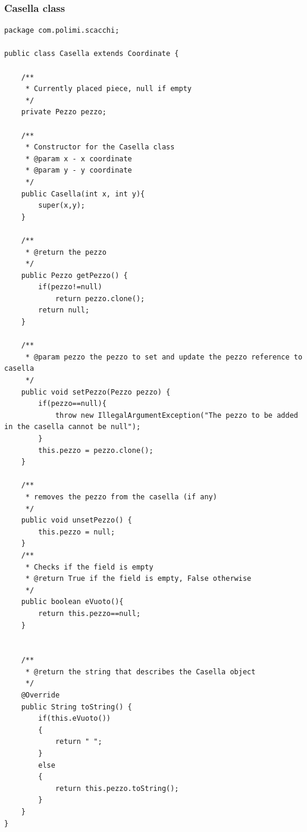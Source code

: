 \documentclass{article}
\begin{document}
\newpage

\subsubsection{Casella class}
\begin{lstlisting}
package com.polimi.scacchi;

public class Casella extends Coordinate {	
	
	/**
	 * Currently placed piece, null if empty
	 */
	private Pezzo pezzo;
	
	/**
	 * Constructor for the Casella class
	 * @param x - x coordinate
	 * @param y - y coordinate
	 */
	public Casella(int x, int y){
		super(x,y);
	}
	
	/**
	 * @return the pezzo
	 */
	public Pezzo getPezzo() {
		if(pezzo!=null)	
			return pezzo.clone();
		return null;
	}

	/**
	 * @param pezzo the pezzo to set and update the pezzo reference to casella
	 */
	public void setPezzo(Pezzo pezzo) {
		if(pezzo==null){
			throw new IllegalArgumentException("The pezzo to be added in the casella cannot be null");
		}
		this.pezzo = pezzo.clone();
	}	
	
	/**
	 * removes the pezzo from the casella (if any)
	 */
	public void unsetPezzo() {
		this.pezzo = null;
	}	
	/**
	 * Checks if the field is empty
	 * @return True if the field is empty, False otherwise
	 */
	public boolean eVuoto(){
		return this.pezzo==null;
	}


	/**
	 * @return the string that describes the Casella object
	 */
	@Override
	public String toString() {
		if(this.eVuoto())
		{
			return " ";
		}
		else
		{
			return this.pezzo.toString();
		}
	}
}
\end{lstlisting}
\end{document}
